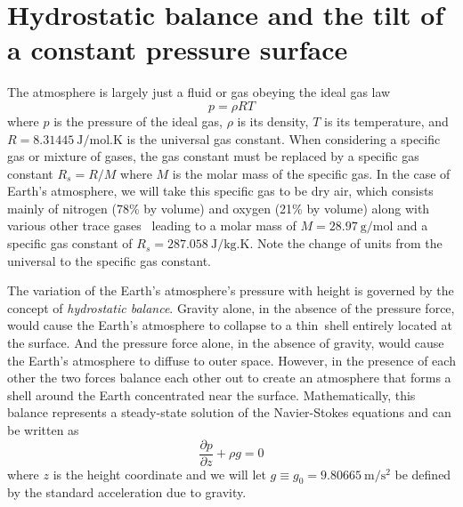 \documentclass[11pt]{article}
\begin{document}
\section{Hydrostatic balance and the tilt of a constant pressure surface}
The atmosphere is largely just a fluid or gas obeying the ideal gas law
\begin{equation} \label{eq:IGL}
  p = \rho RT
\end{equation}
where $p$ is the pressure of the ideal gas, $\rho$ is its density, $T$ is its temperature, and $R = \SI{8.31445}{\J/\mol.\K}$ is the universal gas constant. When considering a specific gas or mixture of gases, the gas constant must be replaced by a specific gas constant $R_s = R/M$ where $M$ is the molar mass of the specific gas. In the case of Earth's atmosphere, we will take this specific gas to be dry air, which consists mainly of nitrogen (78\% by volume) and oxygen (21\% by volume) along with various other trace gases\footnotemark~ leading to a molar mass of $M = \SI{28.97}{\g/\mol}$ and a specific gas constant of $R_s = \SI{287.058}{\J/\kg.\K}$. Note the change of units from the universal to the specific gas constant.


The variation of the Earth's atmosphere's pressure with height is governed by the concept of \emph{hydrostatic balance}. Gravity alone, in the absence of the pressure force, would cause the Earth's atmosphere to collapse to a thin\footnotemark~shell entirely located at the surface. And the pressure force alone, in the absence of gravity, would cause the Earth's atmosphere to diffuse to outer space. However, in the presence of each other the two forces balance each other out to create an atmosphere that forms a shell around the Earth concentrated near the surface. Mathematically, this balance represents a steady-state solution of the Navier-Stokes equations and can be written as
\begin{equation} \label{eq:HB}
  \frac{\partial p}{\partial z} + \rho g = 0
\end{equation}
where $z$ is the height coordinate and we will let $g \equiv g_0 = \SI{9.80665}{\m/\s^2}$ be defined by the standard acceleration due to gravity.
\end{document}
